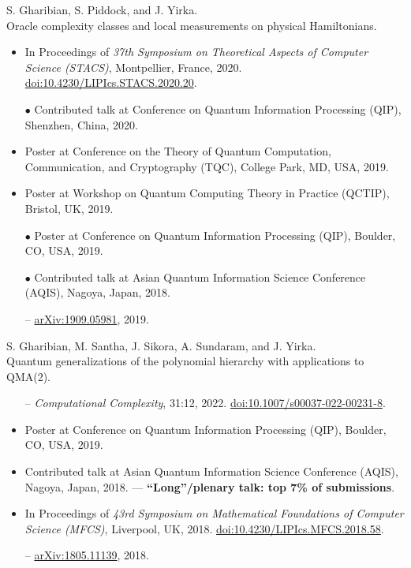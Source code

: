 \documentclass[11pt,letterpaper,serif]{moderncv}
\newcommand{\pubItemSep}{0em}
\begin{document}
S. Gharibian, S. Piddock, and J. Yirka.
\\Oracle complexity classes and local measurements on physical Hamiltonians.
\begin{adjustwidth}{.1in}{}
	\begin{itemize}[itemsep=\pubItemSep]
		\item In Proceedings of \textit{37th Symposium on Theoretical Aspects of Computer Science (STACS)}, Montpellier, France, 2020. \quad
		\href{https://doi.org/10.4230/LIPIcs.STACS.2020.20}{doi:10.4230/LIPIcs.STACS.2020.20}.
		\item[$\bullet$] Contributed talk at Conference on Quantum Information Processing (QIP), Shenzhen, China, 2020.
		\item Poster at Conference on the Theory of Quantum Computation, Communication, and Cryptography (TQC), College Park, MD, USA, 2019.
		\item Poster at Workshop on Quantum Computing Theory in Practice (QCTIP), Bristol, UK, 2019.
		\item[$\bullet$] Poster at Conference on Quantum Information Processing (QIP), Boulder, CO, USA, 2019.
		\item[$\bullet$] Contributed talk at Asian Quantum Information Science Conference (AQIS), Nagoya, Japan, 2018.
		\item[--]  \href{https://arxiv.org/abs/1909.05981}{arXiv:1909.05981}, 2019.
	\end{itemize}
\end{adjustwidth}
\vspace{\parsep}

S. Gharibian, M. Santha, J. Sikora, A. Sundaram, and J. Yirka.
\\Quantum generalizations of the polynomial hierarchy with applications to QMA(2).
\begin{adjustwidth}{.1in}{}
	\begin{itemize}[itemsep=\pubItemSep]
		\item[--] \textit{Computational Complexity}, 31:12, 2022. \quad
		\href{https://doi.org/10.1007/s00037-022-00231-8}{doi:10.1007/s00037-022-00231-8}.
		\item Poster at Conference on Quantum Information Processing (QIP), Boulder, CO, USA, 2019.
		\item Contributed talk at Asian Quantum Information Science Conference (AQIS), Nagoya, Japan, 2018. --- \textbf{``Long''/plenary talk: top 7\% of submissions}.
		\item In Proceedings of \textit{43rd Symposium on Mathematical Foundations of Computer Science (MFCS)}, Liverpool, UK, 2018. \quad
		\href{https://doi.org/10.4230/LIPIcs.MFCS.2018.58}{doi:10.4230/LIPIcs.MFCS.2018.58}.
		\item[--] \href{https://arxiv.org/abs/1805.11139}{arXiv:1805.11139}, 2018.
	\end{itemize}
\end{adjustwidth}
\vspace{\parsep}
\end{document}
